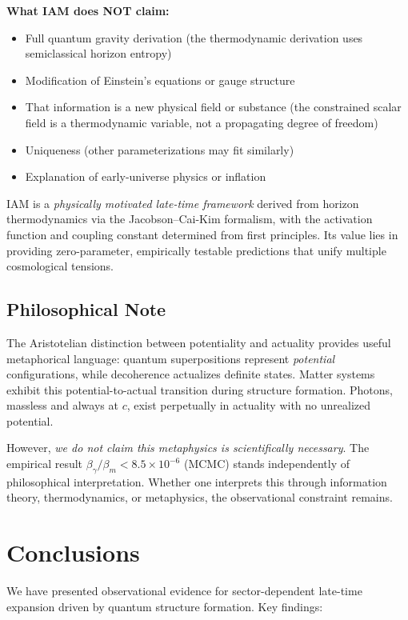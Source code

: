 \documentclass[twocolumn,superscriptaddress,prl,amsmath,amssymb]{revtex4-2}
\begin{document}
\textbf{What IAM does NOT claim:}
\begin{itemize}
\item Full quantum gravity derivation (the thermodynamic derivation uses semiclassical horizon entropy)
\item Modification of Einstein's equations or gauge structure
\item That information is a new physical field or substance (the constrained scalar field is a thermodynamic variable, not a propagating degree of freedom)
\item Uniqueness (other parameterizations may fit similarly)
\item Explanation of early-universe physics or inflation
\end{itemize}

IAM is a \textit{physically motivated late-time framework} derived from horizon thermodynamics via the Jacobson--Cai-Kim formalism, with the activation function and coupling constant determined from first principles. Its value lies in providing zero-parameter, empirically testable predictions that unify multiple cosmological tensions.

\subsection{Philosophical Note}

The Aristotelian distinction between potentiality and actuality provides useful metaphorical language: quantum superpositions represent \textit{potential} configurations, while decoherence actualizes definite states. Matter systems exhibit this potential-to-actual transition during structure formation. Photons, massless and always at $c$, exist perpetually in actuality with no unrealized potential.

However, \textit{we do not claim this metaphysics is scientifically necessary}. The empirical result $\beta_\gamma/\beta_m < 8.5 \times 10^{-6}$ (MCMC) stands independently of philosophical interpretation. Whether one interprets this through information theory, thermodynamics, or metaphysics, the observational constraint remains.

\section{Conclusions}

We have presented observational evidence for sector-dependent late-time expansion driven by quantum structure formation. Key findings:
\end{document}
